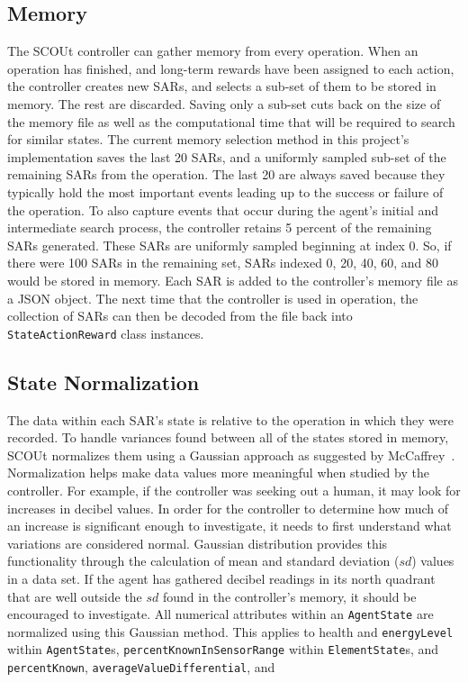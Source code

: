 \subsection{Memory}
The SCOUt controller can gather memory from every operation.
When an operation has finished, and long-term rewards have been assigned to each action, the controller creates new SARs, and selects a sub-set of them to be stored in memory.
The rest are discarded.
Saving only a sub-set cuts back on the size of the memory file as well as the computational time that will be required to search for similar states.
The current memory selection method in this project's implementation saves the last 20 SARs, and a uniformly sampled sub-set of the remaining SARs from the operation.
The last 20 are always saved because they typically hold the most important events leading up to the success or failure of the operation.
To also capture events that occur during the agent's initial and intermediate search process, the controller retains 5 percent of the remaining SARs generated.
These SARs are uniformly sampled beginning at index 0.
So, if there were 100 SARs in the remaining set, SARs indexed 0, 20, 40, 60, and 80 would be stored in memory.
Each SAR is added to the controller's memory file as a JSON object.
The next time that the controller is used in operation, the collection of SARs can then be decoded from the file back into \texttt{StateActionReward} class instances.


\subsection{State Normalization}
The data within each SAR's state is relative to the operation in which they were recorded.
To handle variances found between all of the states stored in memory, SCOUt normalizes them using a Gaussian approach as suggested by McCaffrey~\cite{mccaffrey_how_nodate}.
Normalization helps make data values more meaningful when studied by the controller.
For example, if the controller was seeking out a human, it may look for increases in decibel values.
In order for the controller to determine how much of an increase is significant enough to investigate, it needs to first understand what variations are considered normal.
Gaussian distribution provides this functionality through the calculation of mean and standard deviation ($sd$) values in a data set.
If the agent has gathered decibel readings in its north quadrant that are well outside the $sd$ found in the controller's memory, it should be encouraged to investigate.
All numerical attributes within an \texttt{AgentState} are normalized using this Gaussian method.
This applies to health and \texttt{energyLevel} within \texttt{AgentState}s, \texttt{percentKnownInSensorRange} within \texttt{ElementState}s, and \texttt{percentKnown}, \texttt{averageValueDifferential}, and

